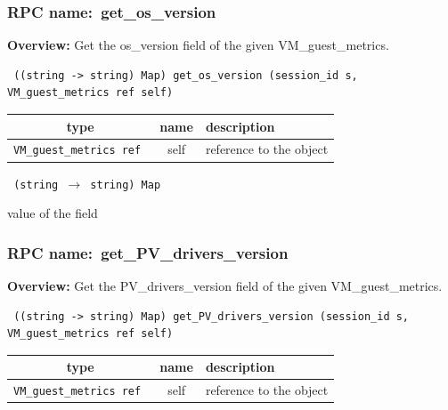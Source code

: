 \subsubsection{RPC name:~get\_os\_version}

{\bf Overview:} 
Get the os\_version field of the given VM\_guest\_metrics.

\begin{verbatim} ((string -> string) Map) get_os_version (session_id s, VM_guest_metrics ref self)\end{verbatim}



 
\vspace{0.3cm}
\begin{tabular}{|c|c|p{7cm}|}
 \hline
{\bf type} & {\bf name} & {\bf description} \\ \hline
{\tt VM\_guest\_metrics ref } & self & reference to the object \\ \hline 

\end{tabular}

\vspace{0.3cm}

{\tt 
(string $\rightarrow$ string) Map
}


value of the field
\vspace{0.3cm}
\vspace{0.3cm}
\vspace{0.3cm}
\subsubsection{RPC name:~get\_PV\_drivers\_version}

{\bf Overview:} 
Get the PV\_drivers\_version field of the given VM\_guest\_metrics.

\begin{verbatim} ((string -> string) Map) get_PV_drivers_version (session_id s, VM_guest_metrics ref self)\end{verbatim}



 
\vspace{0.3cm}
\begin{tabular}{|c|c|p{7cm}|}
 \hline
{\bf type} & {\bf name} & {\bf description} \\ \hline
{\tt VM\_guest\_metrics ref } & self & reference to the object \\ \hline 

\end{tabular}

